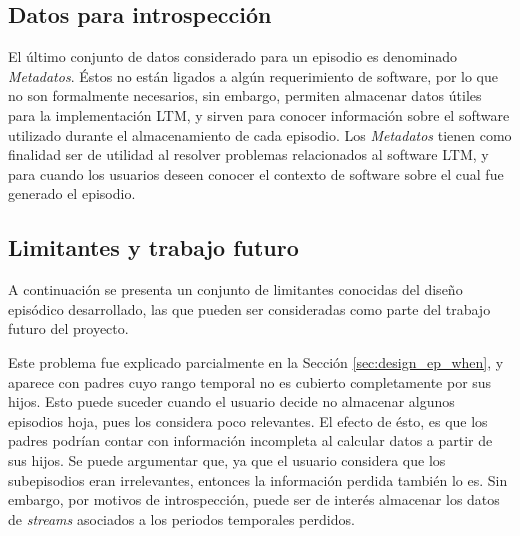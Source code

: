 \subsection{Datos para introspección}

El último conjunto de datos considerado para un episodio es denominado \textit{Metadatos}. Éstos no están ligados a algún requerimiento de software, por lo que no son formalmente necesarios, sin embargo, permiten almacenar datos útiles para la implementación LTM, y sirven para conocer información sobre el software utilizado durante el almacenamiento de cada episodio. Los \textit{Metadatos} tienen como finalidad ser de utilidad al resolver problemas relacionados al software LTM, y para cuando los usuarios deseen conocer el contexto de software sobre el cual fue generado el episodio.


\subsection{Limitantes y trabajo futuro}

A continuación se presenta un conjunto de limitantes conocidas del diseño episódico desarrollado, las que pueden ser consideradas como parte del trabajo futuro del proyecto.

Este problema fue explicado parcialmente en la Sección \ref{sec:design_ep_when}, y aparece con padres cuyo rango temporal no es cubierto completamente por sus hijos. Esto puede suceder cuando el usuario decide no almacenar algunos episodios hoja, pues los considera poco relevantes. El efecto de ésto, es que los padres podrían contar con información incompleta al calcular datos a partir de sus hijos. Se puede argumentar que, ya que el usuario considera que los subepisodios eran irrelevantes, entonces la información perdida también lo es. Sin embargo, por motivos de introspección, puede ser de interés almacenar los datos de \textit{streams} asociados a los periodos temporales perdidos.

